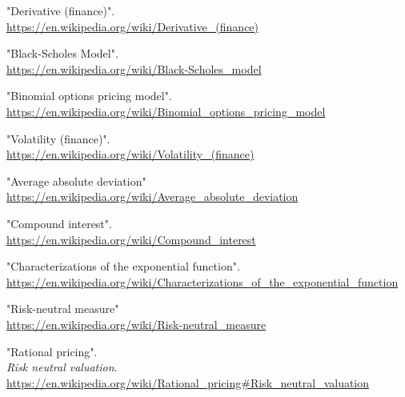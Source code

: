 \documentclass[12pt, letterpaper]{article}\usepackage{float}
\begin{document}
\pagebreak
\begin{thebibliography}{9}
    "Derivative (finance)".
    \\
    \href{https://en.wikipedia.org/wiki/Derivative\_(finance)}{https://en.wikipedia.org/wiki/Derivative\_(finance)}

    "Black-Scholes Model".
    \\
    \href{https://en.wikipedia.org/wiki/Black-Scholes\_model}{https://en.wikipedia.org/wiki/Black-Scholes\_model}

    "Binomial options pricing model".
    \\
    \href{https://en.wikipedia.org/wiki/Binomial\_options\_pricing\_model}{https://en.wikipedia.org/wiki/Binomial\_options\_pricing\_model}

    "Volatility (finance)".
    \\
    \href{https://en.wikipedia.org/wiki/Volatility\_(finance)}{https://en.wikipedia.org/wiki/Volatility\_(finance)}

    "Average absolute deviation"
    \\
    \href{https://en.wikipedia.org/wiki/Average\_absolute\_deviation}{https://en.wikipedia.org/wiki/Average\_absolute\_deviation}

    "Compound interest". \\
    \href{https://en.wikipedia.org/wiki/Compound\_interest}{https://en.wikipedia.org/wiki/Compound\_interest}

    "Characterizations of the exponential function". \\
    \href{https://en.wikipedia.org/wiki/Characterizations\_of\_the\_exponential\_function}{https://en.wikipedia.org/wiki/Characterizations\_of\_the\_exponential\_function}

    "Risk-neutral measure" \\
    \href{https://en.wikipedia.org/wiki/Risk-neutral\_measure}{https://en.wikipedia.org/wiki/Risk-neutral\_measure}

    "Rational pricing". \\
    \textit{Risk neutral valuation}. \\
    \href{https://en.wikipedia.org/wiki/Rational\_pricing\#Risk\_neutral\_valuation}{https://en.wikipedia.org/wiki/Rational\_pricing\#Risk\_neutral\_valuation}


\end{thebibliography}
\end{document}
